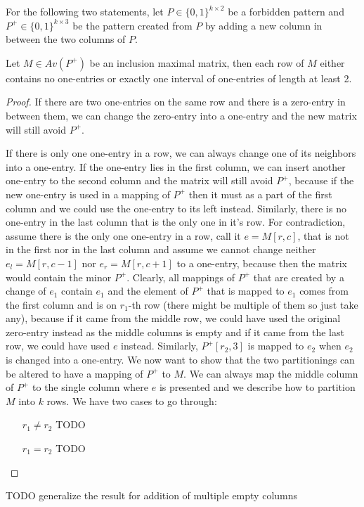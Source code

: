 For the following two statements, let $P\in\{0,1\}^{k\times2}$ be a forbidden pattern and $P^+\in\{0,1\}^{k\times3}$ be the pattern created from $P$ by adding a new column in between the two columns of $P$.
\begin{lemma}
\label{lemmamax}
Let $M\in Av(P^+)$ be an inclusion maximal matrix, then each row of $M$ either contains no one-entries or exactly one interval of one-entries of length at least 2.
\end{lemma}
\begin{proof}
If there are two one-entries on the same row and there is a zero-entry in between them, we can change the zero-entry into a one-entry and the new matrix will still avoid $P^+$.

If there is only one one-entry in a row, we can always change one of its neighbors into a one-entry. If the one-entry lies in the first column, we can insert another one-entry to the second column and the matrix will still avoid $P^+$, because if the new one-entry is used in a mapping of $P^+$ then it must as a part of the first column and we could use the one-entry to its left instead. Similarly, there is no one-entry in the last column that is the only one in it's row. For contradiction, assume there is the only one one-entry in a row, call it $e=M[r,c]$, that is not in the first nor in the last column and assume we cannot change neither $e_l=M[r,c-1]$ nor $e_r=M[r,c+1]$ to a one-entry, because then the matrix would contain the minor $P^+$. Clearly, all mappings of $P^+$ that are created by a change of $e_1$ contain $e_1$ and the element of $P^+$ that is mapped to $e_1$ comes from the first column and is on $r_1$-th row (there might be multiple of them so just take any), because if it came from the middle row, we could have used the original zero-entry instead as the middle columns is empty and if it came from the last row, we could have used $e$ instead. Similarly, $P^+[r_2,3]$ is mapped to $e_2$ when $e_2$ is changed into a one-entry. We now want to show that the two partitionings can be altered to have a mapping of $P^+$ to $M$. We can always map the middle column of $P^+$ to the single column where $e$ is presented and we describe how to partition $M$ into $k$ rows. We have two cases to go through:
\begin{itemize}
\item[$r_1\neq r_2$] TODO
\item[$r_1=r_2$] TODO
\end{itemize}
\end{proof}
TODO generalize the result for addition of multiple empty columns
